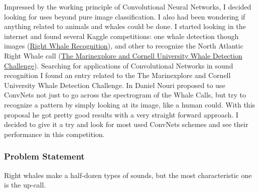 \documentclass[]{article}
\newcommand{\competition}{The Marinexplore and Cornell University Whale Detection Challenge}
\begin{document}
Impressed by the working principle of Convolutional Neural Networks, I decided looking for uses beyond pure image classification. I also had been wondering if anything related to animals and whales could be done. I started looking in the internet and found several Kaggle competitions: one whale detection though images (\href{https://www.kaggle.com/c/noaa-right-whale-recognition}{Right Whale Recognition}), and other to recognize the North Atlantic Right Whale call (\href{https://www.kaggle.com/c/whale-detection-challenge}{\competition}). Searching for applications of Convolutional Networks in sound recognition I found an entry related to the \competition. In \cite{Nouriblog} Daniel Nouri proposed to use ConvNets not just to go across the spectrogram of the Whale Calls, but try to recognize a pattern by simply looking at its image, like a human could. With this proposal he got pretty good results with a very straight forward approach. I decided to give it a try and look for most used ConvNets schemes and see their performance in this competition.


\subsubsection{Problem Statement}\label{problem-statement}

Right whales make a half-dozen types of sounds, but the most characteristic one is the up-call.
\end{document}
